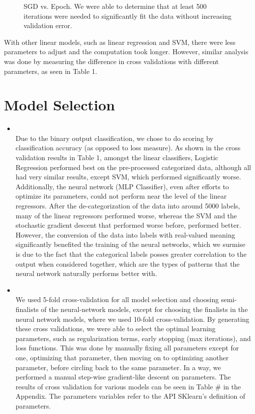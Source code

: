 \begin{itemize}
\begin{itemize}
\begin{figure}[H]
\caption{SGD vs. Epoch. We were able to determine that at least 500 iterations were needed to significantly fit the data without increasing validation error.}
\end{figure}
With other linear models, such as linear regression and SVM, there were less parameters to adjust and the computation took longer. However, similar analysis was done by measuring the difference in cross validations with different parameters, as seen in Table 1.
\end{itemize}

\end{itemize}



\section{Model Selection}
\medskip
\begin{itemize}

    \item {} \\
    Due to the binary output classification, we chose to do scoring by classification accuracy (as opposed to loss measure). As shown in the cross validation results in Table 1, amongst the linear classifiers, Logistic Regression performed best on the pre-processed categorized data, although all had very similar results, except SVM, which performed significantly worse. Additionally, the neural network (MLP Classifier), even after efforts to optimize its parameters, could not perform near the level of the linear regressors. After the de-categorization of the data into around 5000 labels, many of the linear regressors performed worse, whereas the SVM and the stochastic gradient descent that performed worse before, performed better. However, the conversion of the data into labels with real-valued meaning significantly benefited the training of the neural networks, which we surmise is due to the fact that the categorical labels posses greater correlation to the output when considered together, which are the types of patterns that the neural network naturally performs better with.

    \item {} \\
    We used 5-fold cross-validation for all model selection and choosing semi-finalists of the neural-network models, except for choosing the finalists in the neural network models, where we used 10-fold cross-validation.  By generating these cross validations, we were able to select the optimal learning parameters, such as regularization terms, early stopping (max iterations), and loss functions. This was done by manually fixing all parameters except for one, optimizing that parameter, then moving on to optimizing another parameter, before circling back to the same parameter. In a way, we performed a manual step-wise gradient-like descent on parameters. The results of cross validation for various models can be seen in Table \# in the Appendix. The parameters variables refer to the API SKlearn's definition of parameters.

\end{itemize}
